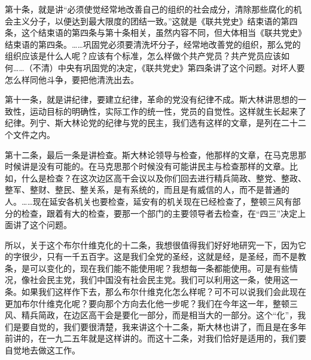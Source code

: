 第十条，就是讲“必须使觉经常地改善自己的组织的社会成分，清除那些腐化的机会主义分子，以便达到最大限度的团结一致。”这就是《联共党史》结束语的第四条，这个结束语的第四条与第十条相关，虽然内容不同，但大体相当《联共党史》结束语的第四条。……巩固党必须要清洗坏分子，经常地改善党的组织，那么党的组织应该是什么人呢？应该有个标准，怎么样做个共产党员？共产党员应该如何……（不清）中央有巩固党的决定，《联共党史》第四条讲了这个问题。对坏人要怎么样同他斗争，要把他清洗出去。

第十一条，就是讲纪律，要建立纪律，革命的党没有纪律不成。斯大林讲思想的一致性，运动目标的明确性，实际工作的统一性，党员的自觉性。这样就生长起来了纪律。列宁、斯大林论党的纪律与党的民主，我们选有这样的文章，是列在二十二个文件之内。

第十二条，最后一条是讲检查。斯大林论领导与检查，他那样的文章，在马克思那时候讲是没有可能的。在马克思那个时候没有可能讲民主与检查那样的文章。比如，什么是检查？在这次边区高干会议以及你们回去进行精兵简政、整党、整政、整军、整财、整民、整关系，是有系统的，而且是有威信的人，而不是普通的人。……现在延安各机关也要检查，延安有的机关现在已经检查了，整顿三风有部分的检查，跟着有大的检查，要那一个部门的主要领导者去检查，在“四三”决定上面讲了这个问题。

所以，关于这个布尔什维克化的十二条，我想很值得我们好好地研究一下，因为它的字很少，只有一千五百字。这是我们全党的圣经，这就是经，是圣经，而不是教条，是可以变化的，现在我们能不能使用呢？我想每一条都能使用。可是有些情况，像社会民主党，我们中国没有社会民主党。我们可以利用这一条，使用这一条。如果我们这样作下去，那么布尔什维克化怎么样呢？可不可以说我们会此现在更加布尔什维克化呢？要向那个方向去化他一步呢？我们在今年这一年，整顿三风、精兵简政，在边区高干会是要化一部分，而是相当大的一部分。这个“化”，我们是要自觉的，我们要很清楚，我来讲这个十二条，斯大林也讲了，而且是在多年前讲的，在一九二五年就是这样讲的。而这十二条，对我们恰好是适用的，我们要自觉地去做这工作。

